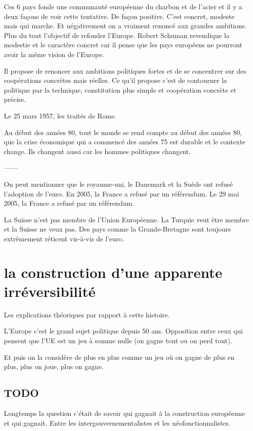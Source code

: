 Ces 6 pays fonde une communauté européenne du charbon et de l'acier et il y a deux façons de voir cette tentative. De façon positive. C'est concret, modeste mais qui marche. Et négativement on a vraiment renoncé aux grandes ambitions. Plus du tout l'objectif de refonder l'Europe. Robert Schuman revendique la modestie et le caractère concret car il pense que les pays européens ne pourront avoir la même vision de l'Europe.

Il propose de renoncer aux ambitions politiques fortes et de se concentrer sur des coopérations concrètes mais réelles. Ce qu'il propose c'est de contourner la politique par la technique, constitution plus simple et coopération concrète et précise.

Le 25 mars 1957, les traités de Rome.

Au début des années 80, tout le monde se rend compte au début des années 80, que la crise économique qui a commencé des années 75 est durable et le contexte change. Ils changent aussi car les hommes politiques changent.

------


On peut mentionner que le royaume-uni, le Danemark et la Suède ont refusé l'adoption de l'euro. En 2005, la France a refusé par un référendum. Le 29 mai 2005, la France a refusé par un référendum.

La Suisse n'est pas membre de l'Union Européenne. La Turquie veut être membre et la Suisse ne veux pas. Des pays comme la Grande-Bretagne sont toujours extrêmement réticent vis-à-vis de l'euro.

\section{la construction d'une apparente irréversibilité}

Les explications théoriques par rapport à cette histoire.

L'Europe c'est le grand sujet politique depuis 50 ans. Opposition entre ceux qui pensent que l'UE est un jeu à somme nulle (on gagne tout ou on perd tout).

Et puis on la considère de plus en plus comme un jeu où on gagne de plus en plus, plus on joue, plus on gagne.

\subsection{TODO}

Longtemps la question c'était de savoir qui gagnait à la construction européenne et qui gagnait. Entre les intergouvernementalistes et les néofonctionnalistes.

